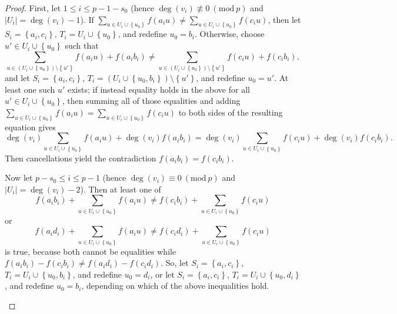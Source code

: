 \documentclass[11pt]{article}
\newcommand\set[1]{\left\{ #1 \right\}}
\newcommand\pars[1]{\left( #1 \right)}
\newcommand\mmod[1]{\ (\mathrm{mod}\ #1)}
\theoremstyle{definition}
\theoremstyle{plain}
\begin{document}
\begin{proof}
    First, let $1\leq i\leq p-1-s_0$ (hence $\deg(v_i)\not\equiv 0\mmod{p}$ and $|U_i|=\deg(v_i)-1$). If $\sum_{u\in U_i\cup \set{u_0}}f(a_iu)\neq \sum_{u\in U_i\cup\set{u_0}}f(c_iu)$, then let $S_i=\set{a_i,c_i}$, $T_i=U_i\cup\set{u_0}$, and redefine $u_0=b_i$. Otherwise, choose $u'\in U_i\cup \set{u_0}$ such that
        \begin{equation*}
            \sum_{u\in \pars{U_i\cup\set{u_0}}\setminus\set{u'}}f(a_iu)+f(a_ib_i)\neq \sum_{u\in \pars{U_i\cup\set{u_0}}\setminus\set{u'}}f(c_iu)+f(c_ib_i),
        \end{equation*}
        and let $S_i=\set{a_i,c_i}$, $T_i=\pars{U_i\cup\set{u_0,b_i}}\setminus\set{u'}$, and redefine $u_0=u'$. At least one such $u'$ exists; if instead equality holds in the above for all $u'\in U_i\cup\set{u_0}$, then summing all of those equalities and adding $\sum_{u\in U_i\cup\set{u_0}}f(a_iu)=\sum_{u\in U_i\cup\set{u_0}}f(c_iu)$ to both sides of the resulting equation gives
        \begin{equation*}
            \deg(v_i)\sum_{u\in U_i\cup \set{u_0}}f(a_iu)+\deg(v_i)f(a_ib_i) = \deg(v_i)\sum_{u\in U_i\cup \set{u_0}}f(c_iu)+\deg(v_i)f(c_ib_i).
        \end{equation*}
        Then cancellations yield the contradiction $f(a_ib_i)=f(c_ib_i)$.
     
    Now let $p-s_0\leq i\leq p-1$  (hence $\deg(v_i)\equiv 0\mmod{p}$ and $|U_i|=\deg(v_i)-2$).  Then at least one of
        \begin{equation*}
            f(a_ib_i)+\sum_{u\in U_i\cup{\set{u_0}}}f(a_iu)\neq f(c_ib_i)+\sum_{u\in U_i\cup{\set{u_0}}}f(c_iu)
        \end{equation*}
        or
        \begin{equation*}
            f(a_id_i)+\sum_{u\in U_i\cup{\set{u_0}}}f(a_iu)\neq f(c_id_i)+\sum_{u\in U_i\cup{\set{u_0}}}f(c_iu)
        \end{equation*}
        is true, because both cannot be equalities while $f(a_ib_i)-f(c_ib_i)\neq f(a_id_i)-f(c_id_i)$. So, let $S_i=\set{a_i,c_i}$, $T_i=U_i\cup\set{u_0,b_i}$, and redefine $u_0=d_i$, or let $S_i=\set{a_i,c_i}$, $T_i=U_i\cup\set{u_0,d_i}$, and redefine $u_0=b_i$, depending on which of the above inequalities hold.
    \begin{figure}[h]
        \centering
\end{figure}
\end{proof}
\end{document}
